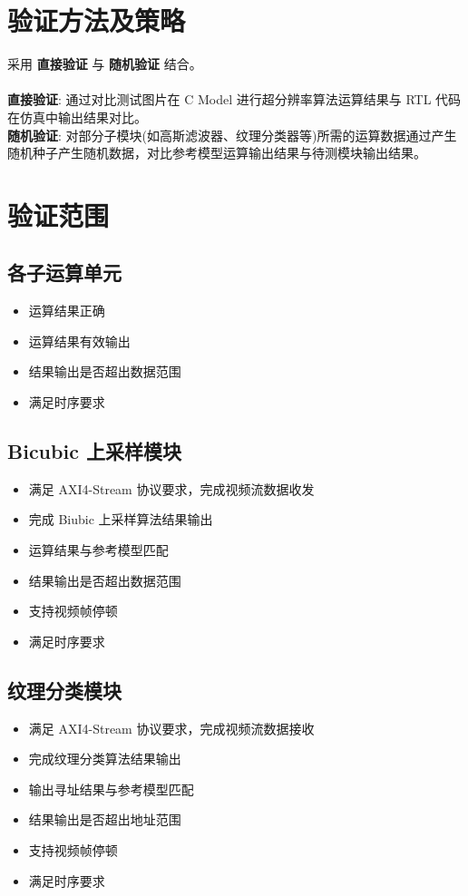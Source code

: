 \documentclass[12pt, a4paper, oneside]{ctexbook}
\begin{document}
	\chapter{验证方法及策略}
	采用 \textbf{直接验证} 与 \textbf{随机验证} 结合。\\ \\
	\textbf{直接验证}: 通过对比测试图片在 C Model 进行超分辨率算法运算结果与 RTL 代码在仿真中输出结果对比。\\
	\textbf{随机验证}: 对部分子模块(如高斯滤波器、纹理分类器等)所需的运算数据通过产生随机种子产生随机数据，对比参考模型运算输出结果与待测模块输出结果。
	
	
	\chapter{验证范围}
		\section{各子运算单元}
		\begin{itemize}
			\item 运算结果正确
			\item 运算结果有效输出
			\item 结果输出是否超出数据范围
			\item 满足时序要求
		\end{itemize}
	
		\section{Bicubic 上采样模块}
		\begin{itemize}
			\item 满足 AXI4-Stream 协议要求，完成视频流数据收发
			\item 完成 Biubic 上采样算法结果输出
			\item 运算结果与参考模型匹配
			\item 结果输出是否超出数据范围
			\item 支持视频帧停顿
			\item 满足时序要求
		\end{itemize}
	
		\section{纹理分类模块}
		\begin{itemize}
			\item 满足 AXI4-Stream 协议要求，完成视频流数据接收
			\item 完成纹理分类算法结果输出
			\item 输出寻址结果与参考模型匹配
			\item 结果输出是否超出地址范围
			\item 支持视频帧停顿
			\item 满足时序要求
		\end{itemize}
\end{document}
